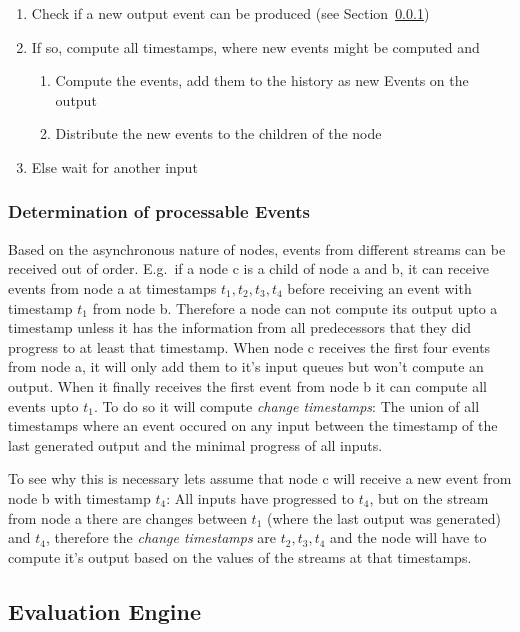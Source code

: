 \begin{enumerate}
  \item Check if a new output event can be produced (see Section~\ref{sec:concepts:defs:nodes:processable})
  \item If so, compute all timestamps, where new events might be computed and
    \begin{enumerate}
      \item Compute the events, add them to the history as new Events on the output
      \item Distribute the new events to the children of the node
    \end{enumerate}
  \item Else wait for another input
\end{enumerate}

\subsubsection{Determination of processable Events}
\label{sec:concepts:defs:nodes:processable}

Based on the asynchronous nature of nodes, events from different streams can be received out of order.
E.g.\ if a node c is a child of node a and b, it can receive events from node a at timestamps \(t_1, t_2, t_3, t_4\)
before receiving an event with timestamp \(t_1\) from node b.
Therefore a node can not compute its output upto a timestamp unless it has the information from all predecessors that they did progress to at least that timestamp.
When node c receives the first four events from node a, it will only add them to it's input queues but won't compute an output.
When it finally receives the first event from node b it can compute all events upto \(t_1\).
To do so it will compute \emph{change timestamps}: The union of all timestamps where an event occured on any input between the timestamp of the last generated output and the minimal progress of all inputs.

To see why this is necessary lets assume that node c will receive a new event from node b with timestamp \(t_4\):
All inputs have progressed to \(t_4\), but on the stream from node a there are changes between \(t_1\) (where the last output was generated) and \(t_4\), therefore the \emph{change timestamps} are \(t_2, t_3, t_4\) and the node will have to compute it's output based on the values of the streams at that timestamps.

\subsection{ Evaluation Engine}
\label{sec:concepts:def:eval_engine}

